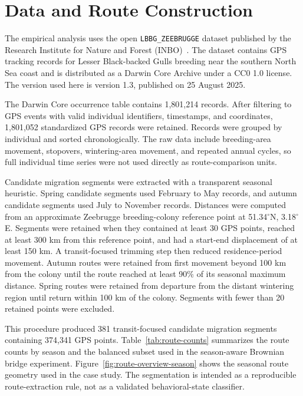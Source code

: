 \documentclass[pdflatex,sn-vancouver-num]{sn-jnl}
\begin{document}
\section{Data and Route Construction}\label{data-and-route-construction}

The empirical analysis uses the open \texttt{LBBG\_ZEEBRUGGE} dataset published by the Research Institute for Nature and Forest (INBO)~\cite{stienen2025}. The dataset contains GPS tracking records for Lesser Black-backed Gulls breeding near the southern North Sea coast and is distributed as a Darwin Core Archive under a CC0 1.0 license. The version used here is version 1.3, published on 25 August 2025.

The Darwin Core occurrence table contains 1,801,214 records. After filtering to GPS events with valid individual identifiers, timestamps, and coordinates, 1,801,052 standardized GPS records were retained. Records were grouped by individual and sorted chronologically. The raw data include breeding-area movement, stopovers, wintering-area movement, and repeated annual cycles, so full individual time series were not used directly as route-comparison units.

Candidate migration segments were extracted with a transparent seasonal heuristic. Spring candidate segments used February to May records, and autumn candidate segments used July to November records. Distances were computed from an approximate Zeebrugge breeding-colony reference point at 51.34$^\circ$N, 3.18$^\circ$E. Segments were retained when they contained at least 30 GPS points, reached at least 300 km from this reference point, and had a start-end displacement of at least 150 km. A transit-focused trimming step then reduced residence-period movement. Autumn routes were retained from first movement beyond 100 km from the colony until the route reached at least 90\% of its seasonal maximum distance. Spring routes were retained from departure from the distant wintering region until return within 100 km of the colony. Segments with fewer than 20 retained points were excluded.

This procedure produced 381 transit-focused candidate migration segments containing 374,341 GPS points. Table~\ref{tab:route-counts} summarizes the route counts by season and the balanced subset used in the season-aware Brownian bridge experiment. Figure~\ref{fig:route-overview-season} shows the seasonal route geometry used in the case study. The segmentation is intended as a reproducible route-extraction rule, not as a validated behavioral-state classifier.
\end{document}
